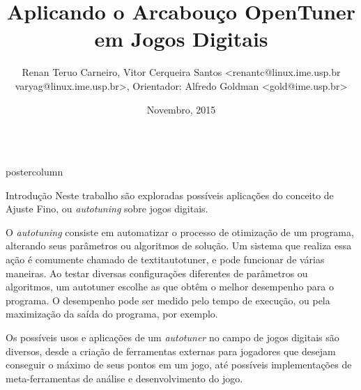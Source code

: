 \documentclass[final]{beamer}
\title{\huge Aplicando o Arcabouço OpenTuner em Jogos Digitais}
\author{Renan Teruo Carneiro, Vitor Cerqueira Santos <renantc@linux.ime.usp.br varyag@linux.ime.usp.br>, Orientador: Alfredo Goldman <gold@ime.usp.br>}
\institute[Universidade de São Paulo] %
{
  Instituto de Matemática e Estatística, Universidade de São Paulo - Trabalho
  de Conclusão de Curso
}
\date[Novembro 2015]{Novembro, 2015}
\newlength{\columnheight}
\begin{document}
\begin{frame}
  \begin{columns}
    \begin{column}{.5\textwidth}
      \begin{beamercolorbox}[center,wd=\textwidth]{postercolumn}
        \begin{minipage}[T]{.95\textwidth} %
          \parbox[t][\columnheight]{\textwidth}{ %
            
            \vspace*{0.8cm}
            
            \begin{block}{Introdução}
            \justifying
                Neste trabalho são exploradas possíveis aplicações do conceito de Ajuste Fino, ou \textit{autotuning} sobre jogos digitais. 
                                
                \vspace*{0.15cm}
                
                O \textit{autotuning} consiste em automatizar o processo de otimização de um programa, alterando seus parâmetros ou algoritmos de solução. Um sistema que realiza essa ação é comumente chamado de textit{autotuner}, e pode funcionar de várias maneiras. Ao testar diversas configurações diferentes de parâmetros ou algoritmos, um autotuner escolhe as que obtêm o melhor desempenho para o programa. O desempenho pode ser medido pelo tempo de execução, ou pela maximização da saída do programa, por exemplo.
                
                \vspace*{0.15cm}
                
                Os possíveis usos e aplicações de um \textit{autotuner} no campo de jogos digitais são diversos, desde a criação de ferramentas externas para jogadores que desejam conseguir o máximo de seus pontos em um jogo, até possíveis implementações de meta-ferramentas de análise e desenvolvimento do jogo.
                
                \vspace*{0.15cm}
                

\end{block}}
\end{minipage}
\end{beamercolorbox}
\end{column}
\end{columns}
\end{frame}
\end{document}
